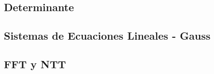 {\subsection{Determinante}
\subsection{Sistemas de Ecuaciones Lineales - Gauss}

\subsection{FFT y NTT}
}
